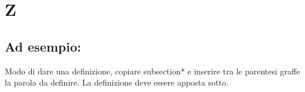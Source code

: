 \section*{Z}
\markright{}
\subsection*{Ad esempio:}
Modo di dare una definizione, copiare subsection*{} e inserire tra le parentesi graffe la parola da definire. La definizione deve essere apposta sotto.